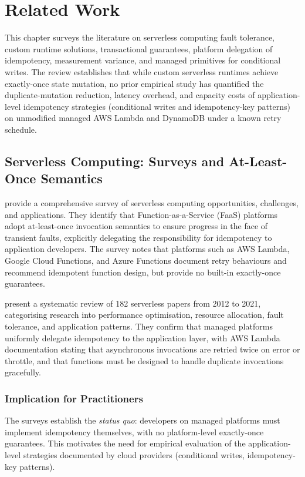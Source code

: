 \chapter{Related Work}

This chapter surveys the literature on serverless computing fault tolerance, custom runtime solutions, transactional guarantees, platform delegation of idempotency, measurement variance, and managed primitives for conditional writes. The review establishes that while custom serverless runtimes achieve exactly-once state mutation, no prior empirical study has quantified the duplicate-mutation reduction, latency overhead, and capacity costs of application-level idempotency strategies (conditional writes and idempotency-key patterns) on unmodified managed AWS Lambda and DynamoDB under a known retry schedule.

\section{Serverless Computing: Surveys and At-Least-Once Semantics}

\citet{Shafiei2022Survey} provide a comprehensive survey of serverless computing opportunities, challenges, and applications. They identify that Function-as-a-Service (FaaS) platforms adopt at-least-once invocation semantics to ensure progress in the face of transient faults, explicitly delegating the responsibility for idempotency to application developers. The survey notes that platforms such as AWS Lambda, Google Cloud Functions, and Azure Functions document retry behaviours and recommend idempotent function design, but provide no built-in exactly-once guarantees.

\citet{Wen2023RiseServerless} present a systematic review of 182 serverless papers from 2012 to 2021, categorising research into performance optimisation, resource allocation, fault tolerance, and application patterns. They confirm that managed platforms uniformly delegate idempotency to the application layer, with AWS Lambda documentation \citep{AWSLambdaDocs} stating that asynchronous invocations are retried twice on error or throttle, and that functions must be designed to handle duplicate invocations gracefully.

\subsection{Implication for Practitioners}

The surveys establish the \textit{status quo}: developers on managed platforms must implement idempotency themselves, with no platform-level exactly-once guarantees. This motivates the need for empirical evaluation of the application-level strategies documented by cloud providers (conditional writes, idempotency-key patterns).

